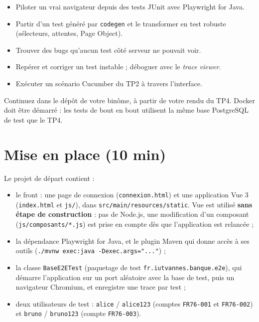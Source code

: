 \documentclass[11pt]{article}
\begin{document}

\begin{infobox}[Objectifs]
\begin{itemize}[leftmargin=1.2em, itemsep=1pt]
  \item Piloter un vrai navigateur depuis des tests JUnit avec Playwright for Java.
  \item Partir d'un test généré par \texttt{codegen} et le transformer en test robuste (sélecteurs, attentes, Page Object).
  \item Trouver des bugs qu'aucun test côté serveur ne pouvait voir.
  \item Repérer et corriger un test instable ; déboguer avec le \textit{trace viewer}.
  \item Exécuter un scénario Cucumber du TP2 à travers l'interface.
\end{itemize}
\end{infobox}

Continuez dans le dépôt de votre binôme, à partir de votre rendu du TP4. Docker doit être démarré : les tests de bout en bout utilisent la même base PostgreSQL de test que le TP4.

\section{Mise en place (10 min)}

Le projet de départ contient :
\begin{itemize}[leftmargin=1.2em, itemsep=1pt]
  \item le front : une page de connexion (\texttt{connexion.html}) et une application Vue 3 (\texttt{index.html} et \texttt{js/}), dans \texttt{src/main/resources/static}. Vue est utilisé \textbf{sans étape de construction} : pas de Node.js, une modification d'un composant (\texttt{js/composants/*.js}) est prise en compte dès que l'application est relancée ;
  \item la dépendance Playwright for Java, et le plugin Maven qui donne accès à ses outils (\texttt{./mvnw exec:java -Dexec.args="..."}) ;
  \item la classe \texttt{BaseE2ETest} (paquetage de test \texttt{fr.iutvannes.banque.e2e}), qui démarre l'application sur un port aléatoire avec la base de test, puis un navigateur Chromium, et enregistre une trace par test ;
  \item deux utilisateurs de test : \texttt{alice} / \texttt{alice123} (comptes \texttt{FR76-001} et \texttt{FR76-002}) et \texttt{bruno} / \texttt{bruno123} (compte \texttt{FR76-003}).
\end{itemize}
\end{document}
